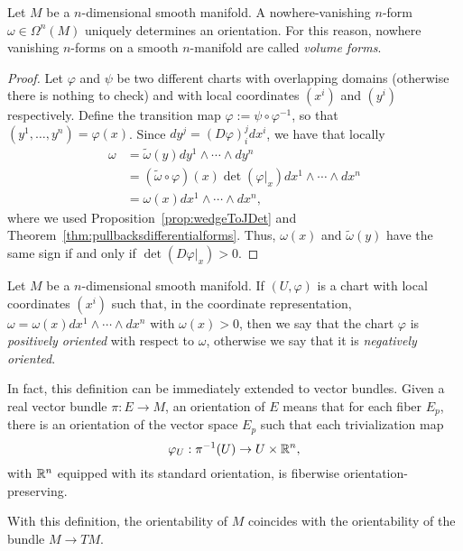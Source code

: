 \begin{theorem}
  Let $M$ be a $n$-dimensional smooth manifold.
  A nowhere-vanishing $n$-form $\omega\in\Omega^n(M)$ uniquely determines an orientation.
  For this reason, nowhere vanishing $n$-forms on a smooth $n$-manifold are called \emph{volume forms}.
\end{theorem}
\begin{proof}
  Let $\varphi$ and $\psi$ be two different charts with overlapping domains (otherwise there is nothing to check) and with local coordinates $(x^i)$ and $(y^i)$ respectively.
  Define the transition map $\varphi := \psi\circ\varphi^{-1}$, so that $(y^1,\ldots,y^n) = \varphi(x)$.
  Since $d y^j = (D\varphi)_i^j dx^i$, we have that locally
  \begin{align}
    \omega &= \widetilde \omega (y) dy^1\wedge\cdots\wedge dy^n \\
    &= (\widetilde\omega \circ \varphi)(x) \det(\varphi|_x) dx^{1}\wedge\cdots\wedge dx^{n} \\
    &= \omega(x) dx^{1}\wedge\cdots\wedge dx^{n},
  \end{align}
  where we used Proposition~\ref{prop:wedgeToJDet} and Theorem~\ref{thm:pullbacksdifferentialforms}.
  Thus, $\omega(x)$ and $\widetilde\omega(y)$ have the same sign if and only if $\det(D\varphi|_x) > 0$.
\end{proof}

\begin{definition}
  Let $M$ be a $n$-dimensional smooth manifold.
  If $(U,\varphi)$ is a chart with local coordinates $(x^i)$ such that, in the coordinate representation, $\omega = \omega(x) dx^1\wedge\cdots\wedge dx^n$ with $\omega(x) > 0$, then we say that the chart $\varphi$ is \emph{positively oriented} with respect to $\omega$, otherwise we say that it is \emph{negatively oriented}.  
\end{definition}

\begin{remark}
  In fact, this definition can be immediately extended to vector bundles.
  Given a real vector bundle $\pi: E \to M$, an orientation of $E$ means that for each fiber $E_p$, there is an orientation of the vector space $E_p$ such that each trivialization map
  \begin{equation}
    \varphi_{U}:\pi^{-1}(U)\to U\times \mathbb{R}^{n},
  \end{equation}
  with $\mathbb{R}^n$ equipped with its standard orientation, is fiberwise orientation-preserving.

  With this definition, the orientability of $M$ coincides with the orientability of the bundle $M\to TM$.
\end{remark}

